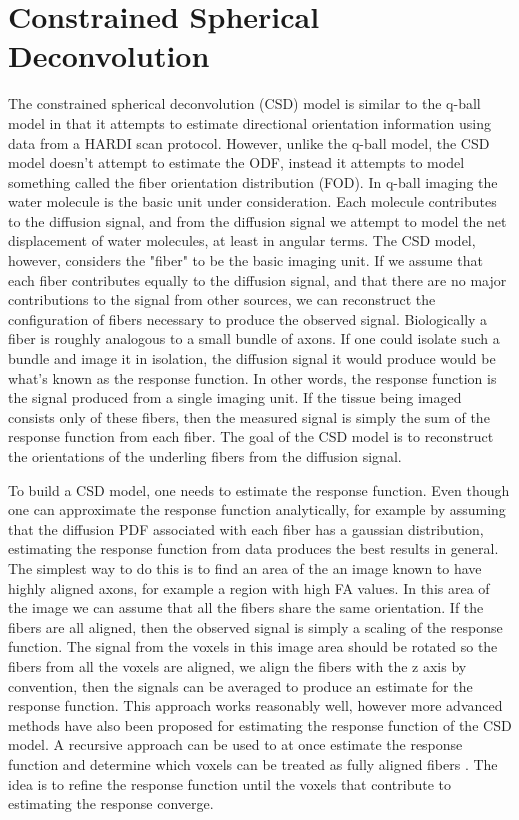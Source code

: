 \section{Constrained Spherical Deconvolution}

The constrained spherical deconvolution (CSD) model is similar to the q-ball model in that it attempts to estimate directional orientation information using data from a HARDI scan protocol. However, unlike the q-ball model, the CSD model doesn't attempt to estimate the ODF, instead it attempts to model something called the fiber orientation distribution (FOD). In q-ball imaging the water molecule is the basic unit under consideration. Each molecule contributes to the diffusion signal, and from the diffusion signal we attempt to model the net displacement of water molecules, at least in angular terms. The CSD model, however, considers the "fiber" to be the basic imaging unit. If we assume that each fiber contributes equally to the diffusion signal, and that there are no major contributions to the signal from other sources, we can reconstruct the configuration of fibers necessary to produce the observed signal. Biologically a fiber is roughly analogous to a small bundle of axons. If one could isolate such a bundle and image it in isolation, the diffusion signal it would produce would be what's known as the response function. In other words, the response function is the signal produced from a single imaging unit. If the tissue being imaged consists only of these fibers, then the measured signal is simply the sum of the response function from each fiber. The goal of the CSD model is to reconstruct the orientations of the underling fibers from the diffusion signal.

To build a CSD model, one needs to estimate the response function. Even though one can approximate the response function analytically, for example by assuming that the diffusion PDF associated with each fiber has a gaussian distribution, estimating the response function from data produces the best results in general. The simplest way to do this is to find an area of the an image known to have highly aligned axons, for example a region with high FA values. In this area of the image we can assume that all the fibers share the same orientation. If the fibers are all aligned, then the observed signal is simply a scaling of the response function. The signal from the voxels in this image area should be rotated so the fibers from all the voxels are aligned, we align the fibers with the z axis by convention, then the signals can be averaged to produce an estimate for the response function. This approach works reasonably well, however more advanced methods have also been proposed for estimating the response function of the CSD model. A recursive approach can be used to at once estimate the response function and determine which voxels can be treated as fully aligned fibers \cite{Tax_2014}. The idea is to refine the response function until the voxels that contribute to estimating the response converge.


